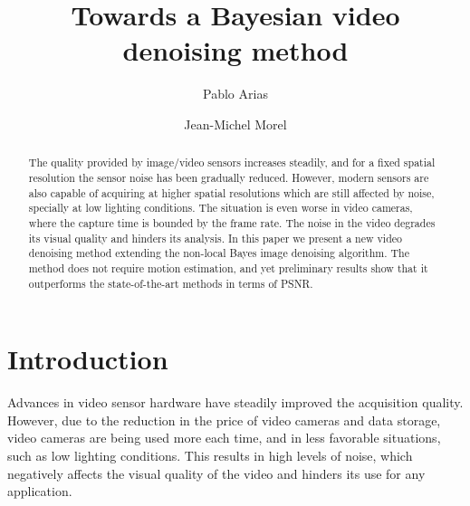 \documentclass{llncs}
\begin{document}
%
%
\mainmatter              %
%
\title{Towards a Bayesian video denoising method}
%
%
\author{Pablo Arias \and Jean-Michel Morel}

%

%

\maketitle              %

\begin{abstract}
	The quality provided by image/video sensors increases steadily, and
	for a fixed spatial resolution the sensor noise has been gradually reduced.
	However, modern sensors are also capable of acquiring at higher spatial
	resolutions which are still affected by noise, specially at low lighting
	conditions. The situation is even worse in video cameras, where the capture
	time is bounded by the frame rate. The noise in the video degrades its visual 
	quality and hinders its analysis.
	In this paper we present a new video denoising method extending 
	the non-local Bayes image denoising algorithm. The method does not require 
	motion estimation, and yet preliminary results show that it outperforms the
	state-of-the-art methods in terms of PSNR.
\end{abstract}
%
\section{Introduction}
%

Advances in video sensor hardware have steadily improved the acquisition
quality. However, due to the reduction in the price of video cameras
and data storage, video cameras are being used more each time, and in less
favorable situations, such as low lighting conditions. This results in high 
levels of noise, which negatively affects the visual quality of the video and
hinders its use for any application. 
\end{document}
